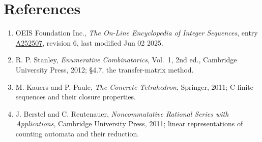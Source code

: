 \documentclass[11pt]{article}
\theoremstyle{definition}
\begin{document}
\section{References}

\begin{enumerate}

\item OEIS Foundation Inc., \emph{The On-Line Encyclopedia of Integer Sequences}, entry \href{https://oeis.org/A252507}{A252507}, revision 6, last modified Jun 02 2025.

\item R. P. Stanley, \emph{Enumerative Combinatorics}, Vol.~1, 2nd ed., Cambridge University Press, 2012; \S4.7, the transfer-matrix method.

\item M. Kauers and P. Paule, \emph{The Concrete Tetrahedron}, Springer, 2011; C-finite sequences and their closure properties.

\item J. Berstel and C. Reutenauer, \emph{Noncommutative Rational Series with Applications}, Cambridge University Press, 2011; linear representations of counting automata and their reduction.

\end{enumerate}
\end{document}
